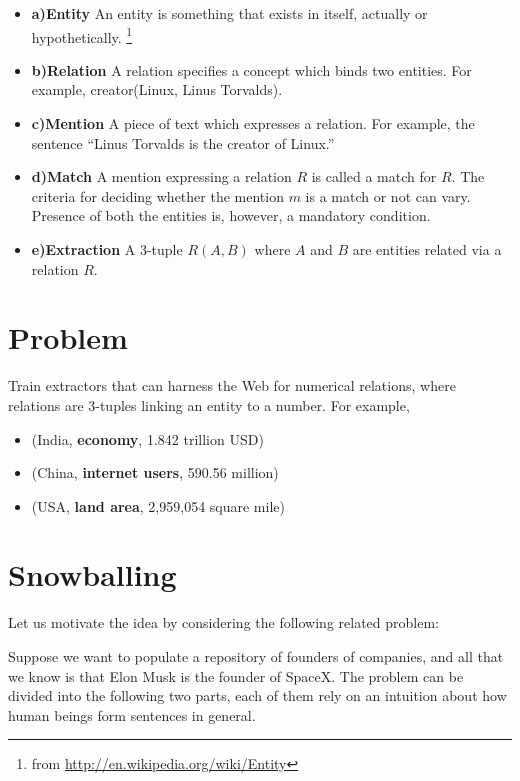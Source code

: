 \documentclass[a4paper,10pt]{article}
\begin{document}
\begin{itemize}

\item \textbf{a)Entity}
An entity is something that exists in itself, actually or hypothetically. \footnote{from \url{http://en.wikipedia.org/wiki/Entity}}

\item \textbf{b)Relation}
A relation specifies a concept which binds two entities. For example, creator(Linux, Linus Torvalds).

\item \textbf{c)Mention}
 A piece of text which expresses a relation. For example, the sentence ``Linus Torvalds is the creator of Linux.''

\item \textbf{d)Match}
A mention expressing a relation $R$ is called a match for $R$. The criteria for deciding whether the mention $m$ is a match or not 
can vary. Presence of both the entities is, however, a mandatory condition.

\item \textbf{e)Extraction}
A 3-tuple $R(A, B)$ where $A$ and $B$ are entities related via a relation $R$.
\end{itemize}

\section{Problem}
Train extractors that can harness the Web for numerical relations, where relations are 3-tuples linking an entity
to a number. For example,
    \begin{itemize}
	\item  (India, \textbf{economy}, 1.842 trillion USD)
	\item  (China, \textbf{internet users},  590.56 million)
	\item  (USA, \textbf{land area}, 2,959,054 square mile)
    \end{itemize}

\section{Snowballing}
Let us motivate the idea by considering the following related problem:

Suppose we want to populate a repository of founders of companies, and all that we know
is that Elon Musk is the founder of SpaceX.
The problem can be divided into the following two parts, each of them rely on an intuition about how human 
beings form sentences in general.
\end{document}
